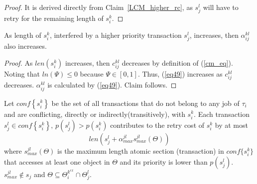 %
\begin{proof}\normalfont
It is derived directly from Claim~\ref{LCM_higher_rc}, as $s_j^l$ will have to retry for the remaining length of $s_i^k$.
\end{proof}
%
\begin{clm}\label{clm:alpha_increase_with_max_interfered}
As length of $s_i^k$, interfered by a higher priority transaction $s_j^l$, increases, then $\alpha_{ij}^{kl}$ also increases.
\end{clm}
%
\begin{proof}\normalfont
%
As $len\left(s_i^k\right)$ increases, then $c_{ij}^{kl}$ decreases by definition of (\ref{cm_eq}). Noting that $ln(\Psi) \le 0$ because $\Psi \in [0,1]$. Thus, (\ref{eq49}) increases as $c_{ij}^{kl}$ decreases. $\alpha_{ij}^{kl}$ is calculated by (\ref{eq49}). Claim follows.
%
\end{proof}
%
\begin{clm}\label{clm:lcm_effect_one_tx_in_rc_multiple_txs}
%
Let $conf\left\{ s_{i}^{k}\right\} $ be the set of all transactions
that do not belong to any job of $\tau_{i}$ and are conflicting, directly or indirectly(transitively), with
$s_{i}^{k}$. Each transaction $s_{j}^{l}\in conf\left\{ s_{i}^{k}\right\},\,p\left(s_j^l\right)>p\left(s_i^k\right) $
contributes to the retry cost of $s_{i}^{k}$ by at most 
\begin{equation}
len\left(s_{j}^{l}+\alpha_{max}^{jl}s_{max}^{jl}(\Theta)\right)\label{eq:lcm_effect_one_tx_in_rc_multiple_txs}
\end{equation}
where $s_{max}^{jl}(\Theta)$ is the maximum length atomic section
(transaction) in $conf\{s_{i}^{k}\}$ that accesses at least one object in $\Theta$ and its priority is lower than $p(s_{j}^{l})$. $s_{max}^{jl} \not\in s_{j}$ and $\Theta\subseteq\Theta_{i}^{k^{ex}}\cap\Theta_{j}^{l}$.
%
\end{clm}
%
